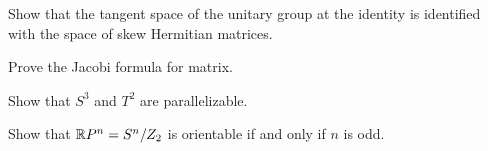 \documentclass[12pt]{article}
\begin{document}
	\begin{prb}
	Show that the tangent space of the unitary group at the identity is identified with the space of skew Hermitian matrices.
	\end{prb}

	\begin{prb}
	Prove the Jacobi formula for matrix.
	\end{prb}

	\begin{prb}
	Show that $S^3$ and $T^2$ are parallelizable.
	\end{prb}

	\begin{prb}
	Show that $\mathbb{R} P^n=S^n/Z_2$ is orientable if and only if $n$ is odd.
	\end{prb}
\end{document}
